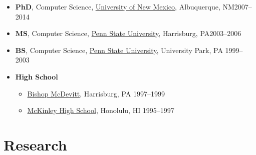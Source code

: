 \documentclass[11pt]{article}
\begin{document}
\begin{itemize}
    
    \item \textbf{PhD}, Computer Science,  \href{https://www.unm.edu}{University of New Mexico}, Albuquerque, NM\hfill 2007--2014
    
    \item \textbf{MS}, Computer Science,  \href{https://www.hbg.psu.edu}{Penn State University}, Harrisburg, PA\hfill 2003--2006
    
    \item \textbf{BS}, Computer Science, \href{https://www.psu.edu}{Penn State University}, University Park, PA \hfill 1999--2003
    
    \item \textbf{High School}
    \begin{itemize}
        \item \href{https://www.bishopmcdevitt.org/mcd/}{Bishop McDevitt}, Harrisburg, PA \hfill 1997--1999
        \item \href{https://www.mckinley.k12.hi.us/}{McKinley High School}, Honolulu, HI \hfill 1995--1997
    \end{itemize}
    
    
\end{itemize}


\section{Research}
\end{document}
